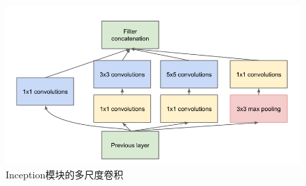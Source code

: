 \begin{figure}[h]
  \centering
  \includegraphics[width=0.75\linewidth]{Img/Inception.png}
  \caption{Inception模块的多尺度卷积}
  \label{fig:Inception}
\end{figure}

